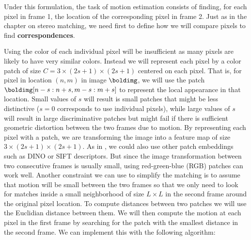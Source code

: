 Under this formulation, the task of motion estimation consists of finding, for each pixel in frame 1, the location of the corresponding pixel in frame 2. Just as in the chapter on stereo matching, we need first to define how we will compare pixels to find {\bf correspondences}. 

Using the color of each individual pixel will be insufficient as many pixels are likely to have very similar colors. Instead we will represent each pixel by a color patch of size $C=3\times(2s+1)\times(2s+1)$ centered on each pixel. That is, for pixel in location $(n,m)$ in image $\boldimg$, we will use the patch $\boldimg [n-s:n+s, m-s:m+s]$ to represent the local appearance in that location. Small values of $s$ will result is small patches that might be less distinctive ($s=0$ corresponds to use individual pixels), while large values of $s$ will result in large discriminative patches but  might fail if there is sufficient geometric distortion between the two frames due to motion. By representing each pixel with a patch, we are transforming the image into a feature map of size $3\times(2s+1)\times(2s+1)$. As in \chap{\ref{chapter:perceptual_organization}}, we could also use other patch embeddings such as DINO or SIFT descriptors. But since the image transformation between two consecutive frames is usually small, using red-green-blue (RGB) patches can work well. Another constraint we can use to simplify the matching is to assume that motion will be small between the two frames so that we only need to look for matches inside a small neighborhood of size $L \times L$ in the second frame around the original pixel location. To compute distances between two patches we will use the Euclidian distance between them. We will then compute the motion at each pixel in the first frame by searching for the patch with the smallest distance in the second frame. We can implement this with the following algorithm:

